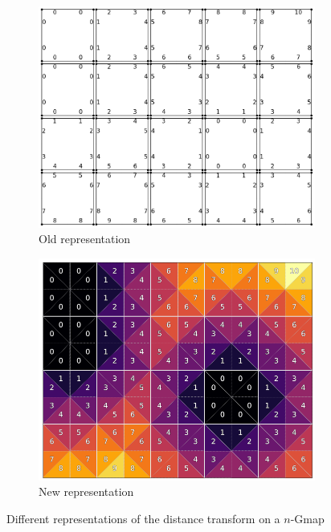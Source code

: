 \begin{figure}[ht]
    \centering
    \begin{subfigure}{0.49\textwidth}
        \centering
        \includegraphics[width=\textwidth]{figures/gmap_dt_old.png}
        \caption{Old representation}
        \label{fig:gmap_dt_old}
    \end{subfigure}
    \hfill
    \begin{subfigure}{0.49\textwidth}
        \centering
        \includegraphics[width=\textwidth]{figures/gmap_dt_new.png}
        \caption{New representation}
        \label{fig:gmap_dt_new}
    \end{subfigure}
    \caption{Different representations of the distance transform on a $n$-Gmap}
    \label{fig:gmap_dt}
\end{figure}

